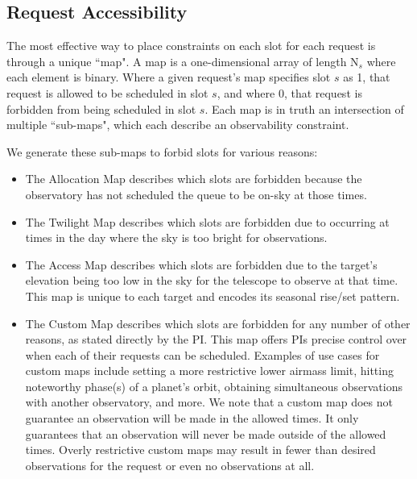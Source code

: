 





\subsection{Request Accessibility}
\label{ObservationalConstraints}

The most effective way to place constraints on each slot for each request is through a unique ``map". A map is a one-dimensional array of length N$_s$ where each element is binary. Where a given request's map specifies slot $s$ as 1, that request is allowed to be scheduled in slot $s$, and where 0, that request is forbidden from being scheduled in slot $s$. Each map is in truth an intersection of multiple ``sub-maps", which each describe an observability constraint. 

We generate these sub-maps to forbid slots for various reasons:
\begin{itemize}
    \item The Allocation Map describes which slots are forbidden because the observatory has not scheduled the queue to be on-sky at those times. 
    \item The Twilight Map describes which slots are forbidden due to occurring at times in the day where the sky is too bright for observations. 
    \item The Access Map describes which slots are forbidden due to the target's elevation being too low in the sky for the telescope to observe at that time. This map is unique to each target and encodes its seasonal rise/set pattern.
    \item The Custom Map describes which slots are forbidden for any number of other reasons, as stated directly by the PI. This map offers PIs precise control over when each of their requests can be scheduled. Examples of use cases for custom maps include setting a more restrictive lower airmass limit, hitting noteworthy phase(s) of a planet's orbit, obtaining simultaneous observations with another observatory, and more. We note that a custom map does not guarantee an observation will be made in the allowed times. It only guarantees that an observation will never be made outside of the allowed times. Overly restrictive custom maps may result in fewer than desired observations for the request or even no observations at all. 
\end{itemize}


